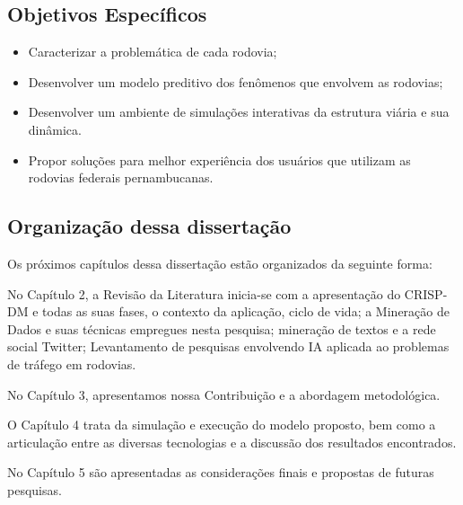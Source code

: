 \subsection{ Objetivos Específicos}\label{intro:especificos}

\begin{itemize}
 \item Caracterizar a problemática de cada rodovia; 
 \item Desenvolver um modelo preditivo dos fenômenos que envolvem as rodovias;
 \item Desenvolver um ambiente de simulações interativas da estrutura viária e sua dinâmica.
 \item Propor soluções para melhor experiência dos usuários que utilizam as rodovias federais pernambucanas.
\end{itemize}


\subsection{ Organização dessa dissertação}\label{intro:sequencia}


Os próximos capítulos dessa dissertação estão organizados da seguinte forma:
\vspace{2mm}

No Capítulo 2, a Revisão da Literatura inicia-se com a apresentação do CRISP-DM  e todas as suas fases, o contexto da aplicação, ciclo de vida; a Mineração de Dados e suas técnicas empregues nesta pesquisa; mineração de textos e a rede social Twitter; Levantamento de pesquisas envolvendo IA aplicada ao problemas de tráfego em rodovias.  

No Capítulo 3, apresentamos nossa Contribuição e a abordagem metodológica.

O Capítulo 4 trata da simulação e execução do modelo proposto, bem como a articulação entre as diversas tecnologias e a discussão dos resultados encontrados.

No Capítulo 5 são apresentadas as considerações finais e propostas de futuras pesquisas.









